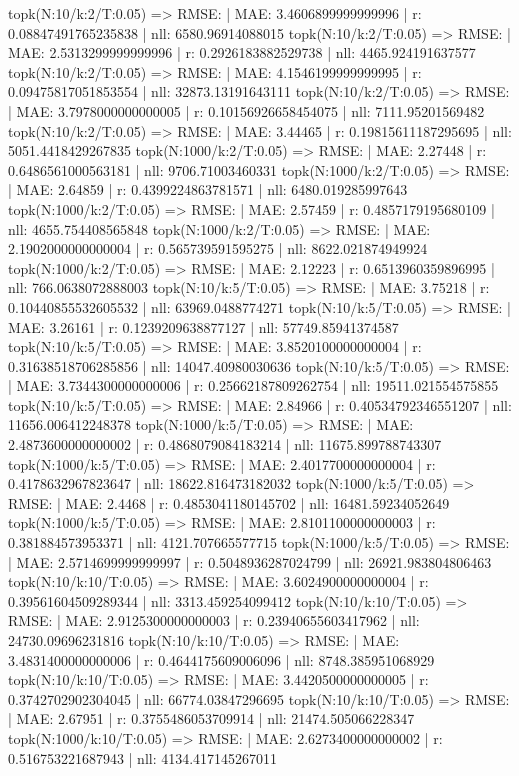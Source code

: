 topk(N:10/k:2/T:0.05) => RMSE: | MAE: 3.4606899999999996 | r: 0.08847491765235838 | nll: 6580.96914088015
topk(N:10/k:2/T:0.05) => RMSE: | MAE: 2.5313299999999996 | r: 0.2926183882529738 | nll: 4465.924191637577
topk(N:10/k:2/T:0.05) => RMSE: | MAE: 4.1546199999999995 | r: 0.09475817051853554 | nll: 32873.13191643111
topk(N:10/k:2/T:0.05) => RMSE: | MAE: 3.7978000000000005 | r: 0.10156926658454075 | nll: 7111.95201569482
topk(N:10/k:2/T:0.05) => RMSE: | MAE: 3.44465 | r: 0.19815611187295695 | nll: 5051.4418429267835
topk(N:1000/k:2/T:0.05) => RMSE: | MAE: 2.27448 | r: 0.6486561000563181 | nll: 9706.71003460331
topk(N:1000/k:2/T:0.05) => RMSE: | MAE: 2.64859 | r: 0.4399224863781571 | nll: 6480.019285997643
topk(N:1000/k:2/T:0.05) => RMSE: | MAE: 2.57459 | r: 0.4857179195680109 | nll: 4655.754408565848
topk(N:1000/k:2/T:0.05) => RMSE: | MAE: 2.1902000000000004 | r: 0.565739591595275 | nll: 8622.021874949924
topk(N:1000/k:2/T:0.05) => RMSE: | MAE: 2.12223 | r: 0.6513960359896995 | nll: 766.0638072888003
topk(N:10/k:5/T:0.05) => RMSE: | MAE: 3.75218 | r: 0.10440855532605532 | nll: 63969.0488774271
topk(N:10/k:5/T:0.05) => RMSE: | MAE: 3.26161 | r: 0.1239209638877127 | nll: 57749.85941374587
topk(N:10/k:5/T:0.05) => RMSE: | MAE: 3.8520100000000004 | r: 0.31638518706285856 | nll: 14047.40980030636
topk(N:10/k:5/T:0.05) => RMSE: | MAE: 3.7344300000000006 | r: 0.25662187809262754 | nll: 19511.021554575855
topk(N:10/k:5/T:0.05) => RMSE: | MAE: 2.84966 | r: 0.40534792346551207 | nll: 11656.006412248378
topk(N:1000/k:5/T:0.05) => RMSE: | MAE: 2.4873600000000002 | r: 0.4868079084183214 | nll: 11675.899788743307
topk(N:1000/k:5/T:0.05) => RMSE: | MAE: 2.4017700000000004 | r: 0.4178632967823647 | nll: 18622.816473182032
topk(N:1000/k:5/T:0.05) => RMSE: | MAE: 2.4468 | r: 0.4853041180145702 | nll: 16481.59234052649
topk(N:1000/k:5/T:0.05) => RMSE: | MAE: 2.8101100000000003 | r: 0.381884573953371 | nll: 4121.707665577715
topk(N:1000/k:5/T:0.05) => RMSE: | MAE: 2.5714699999999997 | r: 0.5048936287024799 | nll: 26921.983804806463
topk(N:10/k:10/T:0.05) => RMSE: | MAE: 3.6024900000000004 | r: 0.39561604509289344 | nll: 3313.459254099412
topk(N:10/k:10/T:0.05) => RMSE: | MAE: 2.9125300000000003 | r: 0.23940655603417962 | nll: 24730.09696231816
topk(N:10/k:10/T:0.05) => RMSE: | MAE: 3.4831400000000006 | r: 0.4644175609006096 | nll: 8748.385951068929
topk(N:10/k:10/T:0.05) => RMSE: | MAE: 3.4420500000000005 | r: 0.3742702902304045 | nll: 66774.03847296695
topk(N:10/k:10/T:0.05) => RMSE: | MAE: 2.67951 | r: 0.3755486053709914 | nll: 21474.505066228347
topk(N:1000/k:10/T:0.05) => RMSE: | MAE: 2.6273400000000002 | r: 0.516753221687943 | nll: 4134.417145267011
